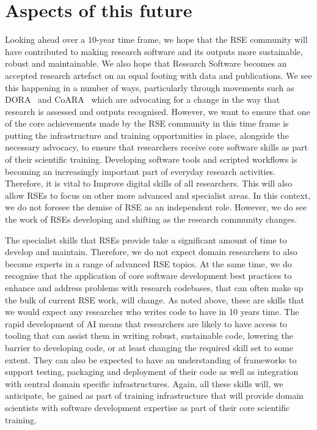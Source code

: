 \documentclass{eceasst}
\begin{document}
\section{Aspects of this future}
Looking ahead over a 10-year time frame, we hope that the RSE community will have
contributed to making research software and its outputs
more sustainable, robust and maintainable.
We also hope that Research Software becomes an accepted research artefact on an equal footing with data and publications.
We see this happening in a number of ways,
particularly through movements such as DORA~\cite{DORA} and CoARA~\cite{COARA} which are advocating for a change in the way that research is assessed and outputs recognised.
However, we want to ensure that one of the core achievements made by the RSE community in this time
frame is putting the infrastructure and training opportunities in place, alongside the necessary
advocacy, to ensure that researchers receive core software skills as part of their scientific training.
Developing software tools and scripted workflows is becoming an increasingly important part of everyday
research activities.
Therefore, it is vital to Improve digital skills of all researchers.
This will also allow RSEs to focus on other more advanced and specialist
areas. In this context, we do not foresee the demise of RSE as an independent role. However, we
do see the work of RSEs developing and shifting as the research community changes.

The specialist skills that RSEs provide take a significant amount of time to develop and maintain.
Therefore, we do not expect domain researchers to also become experts in a range of
advanced RSE topics. 
At the same time, we do recognise that the application of core software development best practices
to enhance and address problems with research codebases, that can often make up the bulk of
current RSE work, will change. As noted above, these are skills that we
would expect any researcher who writes code to have in 10 years time. 
The rapid development of AI means that researchers are likely to have access to tooling that can assist
them in writing robust, sustainable code, lowering the barrier to developing code, or at least changing the
required skill set to some extent.
They can also be expected to have an understanding of frameworks to support testing, packaging and
deployment of their code as well as integration with central domain specific infrastructures.
Again, all these skills will, we anticipate, be gained as part of training infrastructure that will
provide domain scientists with software development expertise as part of their core scientific training.
\end{document}
